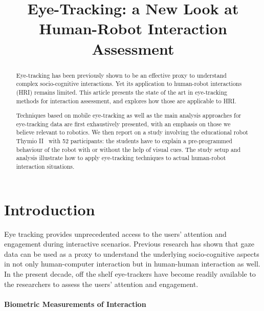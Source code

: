 \documentclass{sig-alternate}
\title{\LARGE \bf
    Eye-Tracking: a New Look at Human-Robot Interaction Assessment
}
\begin{document}
\maketitle
\begin{abstract}


Eye-tracking has been previously shown to be an effective proxy to understand
complex socio-cognitive interactions. Yet its application to human-robot
interactions (HRI) remains limited. This article presents the state of the
art in eye-tracking methods for interaction assessment, and explores how those
are applicable to HRI.

Techniques based on mobile eye-tracking as well as the main analysis approaches
for eye-tracking data are first exhaustively presented, with an emphasis on
those we believe relevant to robotics. We then report on a study involving the
educational robot Thymio II~\cite{riedo2012two} with 52 participants: the
students have to explain a pre-programmed behaviour of the robot with or without
the help of visual cues. The study setup and analysis illustrate how to apply
eye-tracking techniques to actual human-robot interaction situations.

\end{abstract}
\section{Introduction}

Eye tracking provides unprecedented access to the users' attention and
engagement during interactive scenarios. Previous research
\cite{hasse2012measure,tien2010measuring,jermann2010using,sharma2012gaze} has
shown that gaze data can be used as a proxy to understand the underlying
socio-cognitive aspects in not only human-computer interaction but in
human-human interaction as well. In the present decade, off the shelf
eye-trackers have become readily available to the researchers to assess the
users' attention and engagement.



\paragraph{Biometric Measurements of Interaction}
\end{document}
